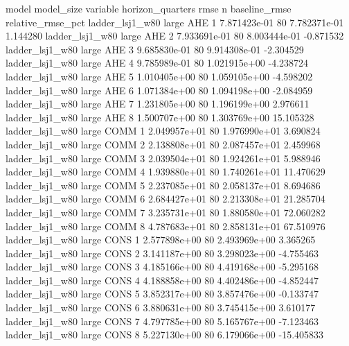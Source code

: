               model model_size variable  horizon_quarters         rmse  n  baseline_rmse  relative_rmse_pct
    ladder_lsj1_w80      large      AHE                 1 7.871423e-01 80   7.782371e-01           1.144280
    ladder_lsj1_w80      large      AHE                 2 7.933691e-01 80   8.003444e-01          -0.871532
    ladder_lsj1_w80      large      AHE                 3 9.685830e-01 80   9.914308e-01          -2.304529
    ladder_lsj1_w80      large      AHE                 4 9.785989e-01 80   1.021915e+00          -4.238724
    ladder_lsj1_w80      large      AHE                 5 1.010405e+00 80   1.059105e+00          -4.598202
    ladder_lsj1_w80      large      AHE                 6 1.071384e+00 80   1.094198e+00          -2.084959
    ladder_lsj1_w80      large      AHE                 7 1.231805e+00 80   1.196199e+00           2.976611
    ladder_lsj1_w80      large      AHE                 8 1.500707e+00 80   1.303769e+00          15.105328
    ladder_lsj1_w80      large     COMM                 1 2.049957e+01 80   1.976990e+01           3.690824
    ladder_lsj1_w80      large     COMM                 2 2.138808e+01 80   2.087457e+01           2.459968
    ladder_lsj1_w80      large     COMM                 3 2.039504e+01 80   1.924261e+01           5.988946
    ladder_lsj1_w80      large     COMM                 4 1.939880e+01 80   1.740261e+01          11.470629
    ladder_lsj1_w80      large     COMM                 5 2.237085e+01 80   2.058137e+01           8.694686
    ladder_lsj1_w80      large     COMM                 6 2.684427e+01 80   2.213308e+01          21.285704
    ladder_lsj1_w80      large     COMM                 7 3.235731e+01 80   1.880580e+01          72.060282
    ladder_lsj1_w80      large     COMM                 8 4.787683e+01 80   2.858131e+01          67.510976
    ladder_lsj1_w80      large     CONS                 1 2.577898e+00 80   2.493969e+00           3.365265
    ladder_lsj1_w80      large     CONS                 2 3.141187e+00 80   3.298023e+00          -4.755463
    ladder_lsj1_w80      large     CONS                 3 4.185166e+00 80   4.419168e+00          -5.295168
    ladder_lsj1_w80      large     CONS                 4 4.188858e+00 80   4.402486e+00          -4.852447
    ladder_lsj1_w80      large     CONS                 5 3.852317e+00 80   3.857476e+00          -0.133747
    ladder_lsj1_w80      large     CONS                 6 3.880631e+00 80   3.745415e+00           3.610177
    ladder_lsj1_w80      large     CONS                 7 4.797785e+00 80   5.165767e+00          -7.123463
    ladder_lsj1_w80      large     CONS                 8 5.227130e+00 80   6.179066e+00         -15.405833
